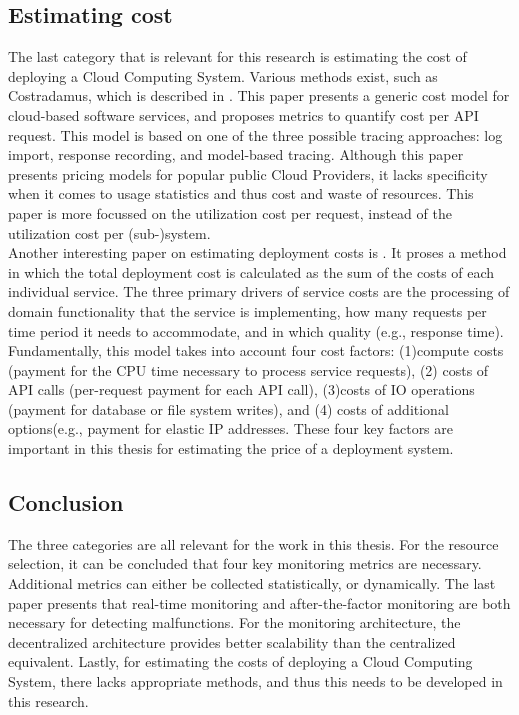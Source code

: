 \subsection{Estimating cost} \label{sec:estimating_cost}
The last category that is relevant for this research is estimating the cost of deploying a Cloud Computing System. Various methods exist, such as Costradamus, which is described in \cite{kuhlenkamp2017costradamus}. This paper presents a generic cost model for cloud-based software services, and proposes metrics to quantify cost per API request. This model is based on one of the three possible tracing approaches: log import, response recording, and model-based tracing. Although this paper presents pricing models for popular public Cloud Providers, it lacks specificity when it comes to usage statistics and thus cost and waste of resources. This paper is more focussed on the utilization cost per request, instead of the utilization cost per (sub-)system.\\

\noindent
Another interesting paper on estimating deployment costs is \cite{leitner2016modelling}. It proses a method in which the total deployment cost is calculated as the sum of the costs of each individual service. The three primary drivers of service costs are the processing of domain functionality that the service is implementing, how many requests per time period it needs to accommodate, and in which quality (e.g., response time). Fundamentally, this model takes into account four cost factors: (1)compute costs (payment for the CPU time necessary to process service requests), (2) costs of API calls (per-request payment for each API call),  (3)costs of IO operations (payment for database or file system writes), and (4) costs of
additional options(e.g., payment for elastic IP addresses. These four key factors are important in this thesis for estimating the price of a deployment system.

\subsection{Conclusion} \label{sec:related_literature_conclusion}
The three categories are all relevant for the work in this thesis. For the resource selection, it can be concluded that four key monitoring metrics are necessary. Additional metrics can either be collected statistically, or dynamically. The last paper presents that real-time monitoring and after-the-factor monitoring are both necessary for detecting malfunctions. For the monitoring architecture, the decentralized architecture provides better scalability than the centralized equivalent. Lastly, for estimating the costs of deploying a Cloud Computing System, there lacks appropriate methods, and thus this needs to be developed in this research. 



